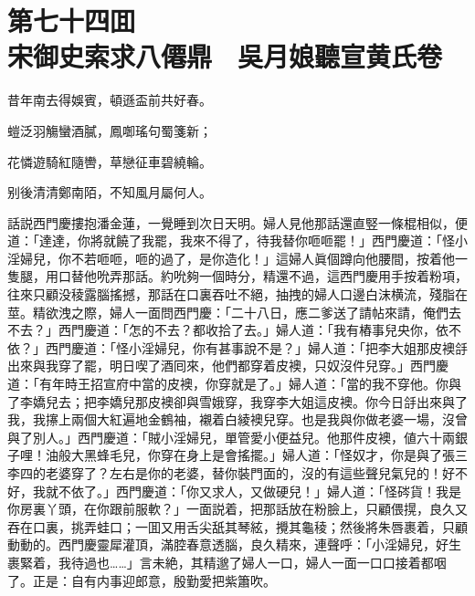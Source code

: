 
\chapter*{第七十四囬　\\宋御史索求八僊鼎　吳月娘聽宣黄氏卷}


\begin{myquote}
昔年南去得娛賓，頓遜盃前共好春。

螘泛羽觴蠻酒膩，鳳啣瑤句蜀箋新；

花憐遊騎紅隨轡，草戀征車碧繞輪。

别後清清鄭南陌，不知風月屬何人。
\end{myquote}

話説西門慶摟抱潘金蓮，一覺睡到次日天明。婦人見他那話還直竪一條棍相似，便道：「達達，你將就饒了我罷，我來不得了，待我替你咂咂罷！」西門慶道：「怪小淫婦兒，你不若咂咂，咂的過了，是你造化！」這婦人眞個蹲向他腰間，按着他一隻腿，用口替他吮弄那話。約吮夠一個時分，精還不過，這西門慶用手按着粉項，往來只顧没稜露腦搖撼，那話在口裏吞吐不絕，抽拽的婦人口邊白沫横流，殘脂在莖。精欲洩之際，婦人一面問西門慶：「二十八日，應二爹送了請帖來請，俺們去不去？」西門慶道：「怎的不去？都收拾了去。」婦人道：「我有樁事兒央你，依不依？」西門慶道：「怪小淫婦兒，你有甚事說不是？」婦人道：「把李大姐那皮襖㧱出來與我穿了罷，明日喫了酒囘來，他們都穿着皮襖，只奴沒件兒穿。」西門慶道：「有年時王招宣府中當的皮襖，你穿就是了。」婦人道：「當的我不穿他。你與了李嬌兒去；把李嬌兒那皮襖卻與雪娥穿，我穿李大姐這皮襖。你今日㧱出來與了我，我㩟上兩個大紅遍地金鶴袖，襯着白綾襖兒穿。也是我與你做老婆一場，沒曾與了別人。」西門慶道：「賊小淫婦兒，單管愛小便益兒。他那件皮襖，値六十兩銀子哩！油般大黑蜂毛兒，你穿在身上是會搖擺。」婦人道：「怪奴才，你是與了張三李四的老婆穿了？左右是你的老婆，替你裝門面的，沒的有這些聲兒氣兒的！好不好，我就不依了。」西門慶道：「你又求人，又做硬兒！」婦人道：「怪硶貨！我是你房裏丫頭，在你跟前服軟？」一面説着，把那話放在粉臉上，只顧偎㨪，良久又吞在口裏，挑弄蛙口；一囬又用舌尖舐其琴絃，攪其龜稜；然後將朱唇裹着，只顧動動的。西門慶靈犀灌頂，滿腔春意透腦，良久精來，連聲呼：「小淫婦兒，好生裹緊着，我待過也……」言未絶，其精邈了婦人一口，婦人一面一口口接着都咽了。正是：自有内事迎郎意，殷勤愛把紫簫吹。

